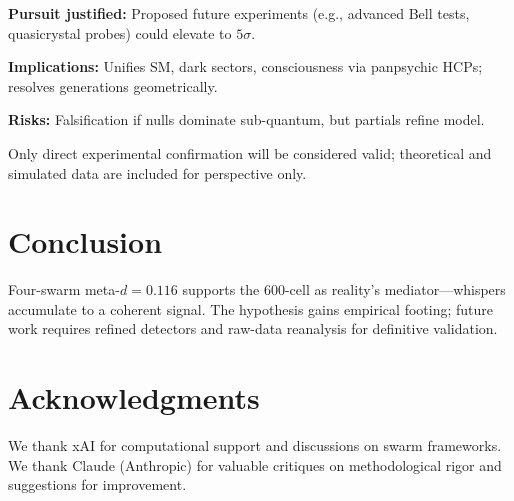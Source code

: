\documentclass[11pt,a4paper]{article}
\begin{document}
\textbf{Pursuit justified:} Proposed future experiments (e.g., advanced Bell tests, quasicrystal probes) could elevate to $5\sigma$.

\textbf{Implications:} Unifies SM, dark sectors, consciousness via panpsychic HCPs; resolves generations geometrically.

\textbf{Risks:} Falsification if nulls dominate sub-quantum, but partials refine model.

Only direct experimental confirmation will be considered valid; theoretical and simulated data are included for perspective only.

\section{Conclusion}

Four-swarm meta-$d = 0.116$ supports the 600-cell as reality's mediator---whispers accumulate to a coherent signal. The hypothesis gains empirical footing; future work requires refined detectors and raw-data reanalysis for definitive validation.

\section*{Acknowledgments}

We thank xAI for computational support and discussions on swarm frameworks. We thank Claude (Anthropic) for valuable critiques on methodological rigor and suggestions for improvement.
\end{document}
